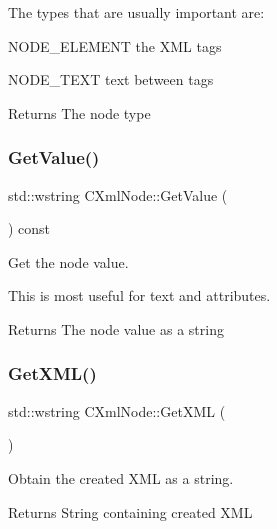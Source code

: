 The types that are usually important are\+:
\begin{DoxyItemize}
\item N\+O\+D\+E\+\_\+\+E\+L\+E\+M\+E\+NT the X\+ML tags
\item N\+O\+D\+E\+\_\+\+T\+E\+XT text between tags
\end{DoxyItemize}

\begin{DoxyReturn}{Returns}
The node type 
\end{DoxyReturn}
\mbox{\label{classxmlnode_1_1_c_xml_node_ac0593ce9fc62dd3e9777506c0c3a84bf}} 
\subsubsection{\texorpdfstring{Get\+Value()}{GetValue()}}
{\footnotesize\ttfamily std\+::wstring C\+Xml\+Node\+::\+Get\+Value (\begin{DoxyParamCaption}{ }\end{DoxyParamCaption}) const}



Get the node value. 

This is most useful for text and attributes. \begin{DoxyReturn}{Returns}
The node value as a string 
\end{DoxyReturn}
\mbox{\label{classxmlnode_1_1_c_xml_node_a700c3de386529eab05b185c38b17fd51}} 
\subsubsection{\texorpdfstring{Get\+X\+M\+L()}{GetXML()}}
{\footnotesize\ttfamily std\+::wstring C\+Xml\+Node\+::\+Get\+X\+ML (\begin{DoxyParamCaption}{ }\end{DoxyParamCaption})}



Obtain the created X\+ML as a string. 

\begin{DoxyReturn}{Returns}
String containing created X\+ML 
\end{DoxyReturn}
\mbox{\label{classxmlnode_1_1_c_xml_node_abfd7b791490e58aac7091b78e36bd24b}} 
